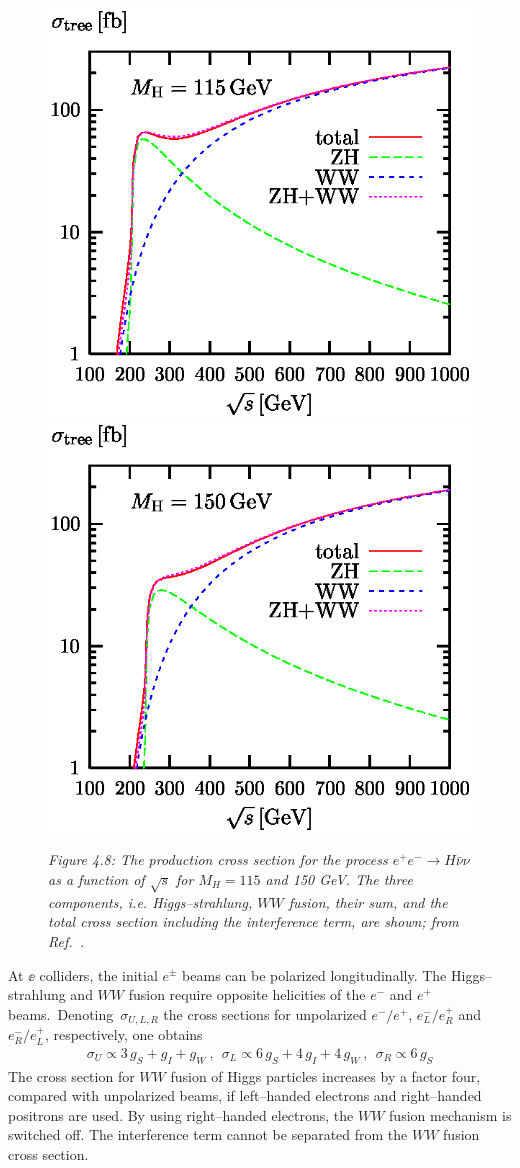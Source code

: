 \begin{figure}[hbtp]
\vspace*{2mm}
\centerline{\includegraphics[width=.51\textwidth]{./sm4/tcs.born.log.115.eps}
\includegraphics[width=.51\textwidth]{./sm4/tcs.born.log.150.eps}}  
\vspace*{1mm}
{\it Figure 4.8: The production cross section for the process $e^+e^-\to
H\bar\nu\nu$ as a function of $\sqrt{s}$ for $M_H=115$ and 150 GeV. 
The three components, i.e. Higgs--strahlung, $WW$ fusion, their sum, and
the total cross section including the interference term, are shown;
from Ref.~\cite{RCWW1}.}
\end{figure}%

At $\ee$ colliders, the initial $e^\pm$  beams can be polarized longitudinally.
The Higgs--strahlung and $WW$ fusion require opposite helicities of the $e^-$ 
and $e^+$ beams.~Denoting~$\sigma_{U,L,R}$ the cross sections for 
unpolarized $e^-/e^+$, $e^-_L/e^+_R$ and $e^-_R/e^+_L$, respectively, one 
obtains \cite{VVH-Kilian}
\begin{eqnarray}
  \sigma_U  \propto 3\, g_S + g_I + g_W \ , \ \
  \sigma_L  \propto 6\, g_S + 4\,g_I + 4\,g_W\ , \ \   
  \sigma_R \propto 6\, g_S
\end{eqnarray}
The cross section for $WW$ fusion of Higgs particles increases by a
factor four, compared with unpolarized beams, if left--handed electrons
and right--handed positrons are used.  By using right--handed electrons,
the $WW$ fusion mechanism is switched off. The interference term
cannot be separated from the $WW$ fusion cross section.

